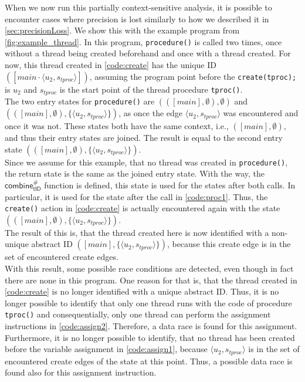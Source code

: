   \noindent When we now run this partially context-sensitive analysis, it is possible to encounter cases where precision is lost similarly to how we described it in \autoref{sec:precisionLoss}. We show this with the example program from \autoref{fig:example_thread}. In this program, \texttt{procedure()} is called two times, once without a thread being created beforehand and once with a thread created. For now, this thread created in \autoref{code:create} has the unique ID $([main \cdot \langle u_2, s_{tproc} \rangle])$, assuming the program point before the \texttt{create(tproc);} is $u_2$ and $s_{tproc}$ is the start point of the thread procedure \texttt{tproc()}.\\
  The two entry states for \texttt{procedure()} are $(([main], \emptyset), \emptyset)$ and $(([main], \emptyset), \{\langle u_2, s_{tproc} \rangle\})$, as once the edge $\langle u_2, s_{tproc} \rangle$ was encountered and once it was not. These states both have the same context, i.e., $([main], \emptyset)$, and thus their entry states are joined. The result is equal to the second entry state $(([main], \emptyset), \{\langle u_2, s_{tproc} \rangle\})$.\\
  Since we assume for this example, that no thread was created in \texttt{procedure()}, the return state is the same as the joined entry state. With the way, the $\textsf{combine}^{\#}_\textsf{tID}$ function is defined, this state is used for the states after both calls. In particular, it is used for the state after the call in \autoref{code:proc1}. Thus, the \texttt{create()} action in \autoref{code:create} is actually encountered again with the state $(([main], \emptyset), \{\langle u_2, s_{tproc} \rangle\})$.\\
  The result of this is, that the thread created here is now identified with a non-unique abstract ID $([main], \{\langle u_2, s_{tproc} \rangle\})$, because this create edge is in the set of encountered create edges.\\
  With this result, some possible race conditions are detected, even though in fact there are none in this program. One reason for that is, that the thread created in \autoref{code:create} is no longer identified with a unique abstract ID. Thus, it is no longer possible to identify that only one thread runs with the code of procedure \texttt{tproc()} and consequentially, only one thread can perform the assignment instructions in \autoref{code:assign2}. Therefore, a data race is found for this assignment.\\
  Furthermore, it is no longer possible to identify, that no thread has been created before the variable assignment in \autoref{code:assign1}, because $\langle u_2, s_{tproc} \rangle$ is in the set of encountered create edges of the state at this point. Thus, a possible data race is found also for this assignment instruction.\\
